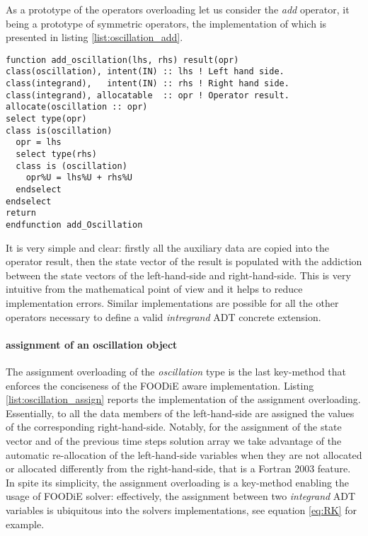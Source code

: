 \documentclass[pdftex,preprint,3p,times,numbers]{elsarticle}
\begin{document}
As a prototype of the operators overloading let us consider the \emph{add} operator, it being a prototype of symmetric operators, the implementation of which is presented in listing \ref{list:oscillation_add}.

\begin{lstlisting}[firstnumber=1,style=code,caption={implementation of the \emph{oscillation integrand} add operator},label={list:oscillation_add}]
function add_oscillation(lhs, rhs) result(opr)
class(oscillation), intent(IN) :: lhs ! Left hand side.
class(integrand),   intent(IN) :: rhs ! Right hand side.
class(integrand), allocatable  :: opr ! Operator result.
allocate(oscillation :: opr)
select type(opr)
class is(oscillation)
  opr = lhs
  select type(rhs)
  class is (oscillation)
    opr%U = lhs%U + rhs%U
  endselect
endselect
return
endfunction add_Oscillation
\end{lstlisting}
It is very simple and clear: firstly all the auxiliary data are copied into the operator result, then the state vector of the result is populated with the addiction between the state vectors of the left-hand-side and right-hand-side. This is very intuitive from the mathematical point of view and it helps to reduce implementation errors. Similar implementations are possible for all the other operators necessary to define a valid \emph{intregrand} ADT concrete extension.

\paragraph{assignment of an oscillation object}

The assignment overloading of the \emph{oscillation} type is the last key-method that enforces the conciseness of the FOODiE aware implementation. Listing \ref{list:oscillation_assign} reports the implementation of the assignment overloading. Essentially, to all the data members of the left-hand-side are assigned the values of the corresponding right-hand-side. Notably, for the assignment of the state vector and of the previous time steps solution array we take advantage of the automatic re-allocation of the left-hand-side variables when they are not allocated or allocated differently from the right-hand-side, that is a Fortran 2003 feature. In spite its simplicity, the assignment overloading is a key-method enabling the usage of FOODiE solver: effectively, the assignment between two \emph{integrand} ADT variables is ubiquitous into the solvers implementations, see equation \ref{eq:RK} for example.
\end{document}
